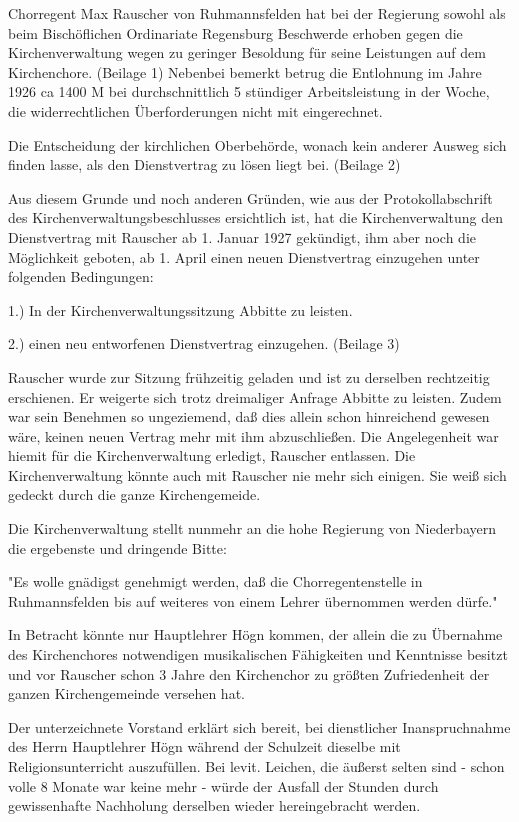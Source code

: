 \documentclass[12pt,a4pager]{book}
\begin{document}
Chorregent Max Rauscher von Ruhmannsfelden hat bei der Regierung sowohl als beim
Bischöflichen Ordinariate Regensburg Beschwerde erhoben gegen die
Kirchenverwaltung wegen zu geringer Besoldung für seine Leistungen auf dem
Kirchenchore. (Beilage 1) Nebenbei bemerkt betrug die Entlohnung im Jahre 1926
ca 1400 M bei durchschnittlich 5 stündiger Arbeitsleistung in der Woche, die
widerrechtlichen Überforderungen nicht mit eingerechnet.

Die Entscheidung der kirchlichen Oberbehörde, wonach kein anderer Ausweg sich
finden lasse, als den Dienstvertrag zu lösen liegt bei. (Beilage 2)

Aus diesem Grunde und noch anderen Gründen, wie aus der Protokollabschrift des
Kirchenverwaltungsbeschlusses ersichtlich ist, hat die Kirchenverwaltung den
Dienstvertrag mit Rauscher ab 1. Januar 1927 gekündigt, ihm aber noch die
Möglichkeit geboten, ab 1. April einen neuen Dienstvertrag einzugehen unter
folgenden Bedingungen:

    1.) In der Kirchenverwaltungssitzung Abbitte zu leisten.

    2.) einen neu entworfenen Dienstvertrag einzugehen. (Beilage 3)

Rauscher wurde zur Sitzung frühzeitig geladen und ist zu derselben rechtzeitig
erschienen. Er weigerte sich trotz dreimaliger Anfrage Abbitte zu leisten. Zudem
war sein Benehmen so ungeziemend, daß dies allein schon hinreichend gewesen
wäre, keinen neuen Vertrag mehr mit ihm abzuschließen. Die Angelegenheit war
hiemit für die Kirchenverwaltung erledigt, Rauscher entlassen. Die
Kirchenverwaltung könnte auch mit Rauscher nie mehr sich einigen. Sie weiß sich
gedeckt durch die ganze Kirchengemeide.

Die Kirchenverwaltung stellt nunmehr an die hohe Regierung von Niederbayern die
ergebenste und dringende Bitte:

"Es wolle gnädigst genehmigt werden, daß die Chorregentenstelle in
Ruhmannsfelden bis auf weiteres von einem Lehrer übernommen werden dürfe."

In Betracht könnte nur Hauptlehrer Högn kommen, der allein die zu Übernahme des
Kirchenchores notwendigen musikalischen Fähigkeiten und Kenntnisse besitzt und
vor Rauscher schon 3 Jahre den Kirchenchor zu größten Zufriedenheit der ganzen
Kirchengemeinde versehen hat.

Der unterzeichnete Vorstand erklärt sich bereit, bei dienstlicher
Inanspruchnahme des Herrn Hauptlehrer Högn während der Schulzeit dieselbe mit
Religionsunterricht auszufüllen. Bei levit. Leichen, die äußerst selten sind -
schon volle 8 Monate war keine mehr - würde der Ausfall der Stunden durch
gewissenhafte Nachholung derselben wieder hereingebracht werden.
\end{document}
